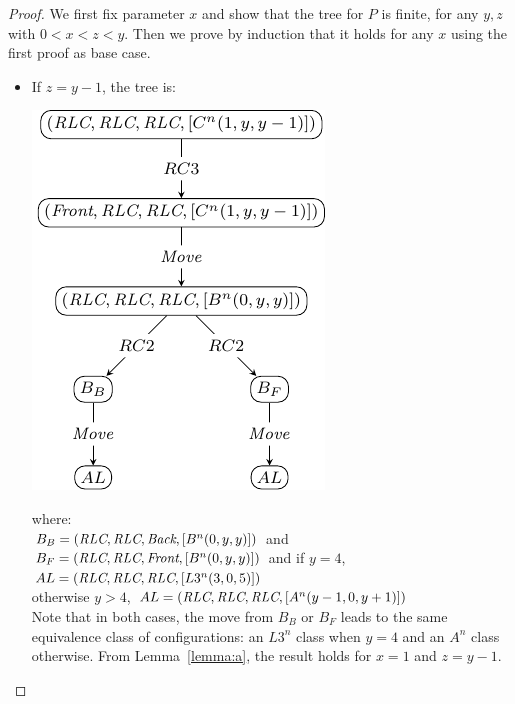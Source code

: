 \begin{proof}
  We first fix parameter $x$ and show that the tree for $P$ is
  finite, for any $y, z$ with $0<x<z<y$. Then we prove by induction
  that it holds for any $x$ using the first proof as base case.

\begin{description}[parsep=0cm, itemsep=0cm, topsep=0cm]
\item [{\bf Base-case}: x=1]
\end{description}  
\begin{itemize}[parsep=0cm, itemsep=0cm, topsep=0cm] 
\item %
	If $z = y-1$, the tree is:
	\begin{center}
	\includegraphics[scale=1]{figures/figCx12} 
	\end{center}
	where: \\
$ B_B = (\textit{RLC}, \textit{RLC}, \textit{Back}, [B^n(0, y, y)])$ and $ B_F = (\textit{RLC}, \textit{RLC}, \textit{Front}, [B^n(0, y, y)])$
and if $y=4$, $AL  = (\textit{RLC}, \textit{RLC}, \textit{RLC}, [L3^n(3, 0, 5)])$\\
otherwise $y > 4$, $AL = (\textit{RLC}, \textit{RLC}, \textit{RLC}, [A^n(y-1, 0, y+1)])$\\
Note that in both cases, the move from $B_B$ or $B_F$ leads to the same 
equivalence class of configurations: an $L3^n$ class when $y=4$ and 
an $A^n$ class otherwise. 
From Lemma~\ref{lemma:a}, the result holds for 
$x=1$ and $z = y-1$.


\end{itemize}
\end{proof}

